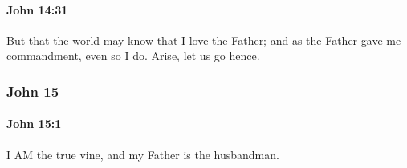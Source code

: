 		\paragraph{John 14:31} %
			\label{JOHN-14-31}

			But that the world may know that I love the Father; and as the Father gave me commandment, even so I do. Arise, let us go hence.

			\begin{framed}
				\scriptsize
				\begin{compactdesc}
					\item[SBLG] 
				\end{compactdesc}
			\end{framed}

	\subsubsection{John 15} %
		\label{JOHN-15}
		
		\paragraph{John 15:1} %
			\label{JOHN-15-1}

			I AM the true vine, and my Father is the husbandman.

